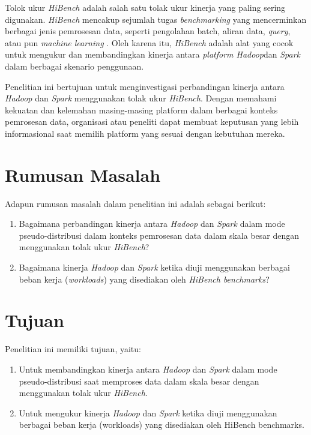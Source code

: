 Tolok ukur \textit{HiBench} adalah salah satu tolak ukur kinerja yang paling sering digunakan. \textit{HiBench} mencakup sejumlah tugas \textit{benchmarking} yang mencerminkan berbagai jenis pemrosesan data, seperti pengolahan batch, aliran data, \textit{query}, atau pun \textit{machine learning} \cite{huangHiBenchBenchmarkSuite}. Oleh karena itu, \textit{HiBench} adalah alat yang cocok untuk mengukur dan membandingkan kinerja antara \textit{platform Hadoop}dan \textit{Spark} dalam berbagai skenario penggunaan.

Penelitian ini bertujuan untuk menginvestigasi perbandingan kinerja antara \textit{Hadoop} dan \textit{Spark} menggunakan tolak ukur \textit{HiBench}. Dengan memahami kekuatan dan kelemahan masing-masing platform dalam berbagai konteks pemrosesan data, organisasi atau peneliti dapat membuat keputusan yang lebih informasional saat memilih platform yang sesuai dengan kebutuhan mereka.

\section{Rumusan Masalah}
Adapun rumusan masalah dalam penelitian ini adalah sebagai berikut:
\begin{enumerate}{\tiny }
	\item 
	Bagaimana perbandingan kinerja antara \textit{Hadoop} dan \textit{Spark} dalam mode pseudo-distribusi dalam konteks pemrosesan data dalam skala besar dengan menggunakan tolak ukur \textit{HiBench}?
	\item
	Bagaimana kinerja \textit{Hadoop} dan \textit{Spark} ketika diuji menggunakan berbagai beban kerja (\textit{workloads}) yang disediakan oleh \textit{HiBench benchmarks}?
\end{enumerate}

\section{Tujuan}
Penelitian ini memiliki tujuan, yaitu:
	\begin{enumerate}
		\item 
		Untuk membandingkan kinerja antara \textit{Hadoop} dan \textit{Spark} dalam mode pseudo-distribusi saat memproses data dalam skala besar dengan menggunakan tolak ukur \textit{HiBench}.
		\item
		Untuk mengukur kinerja \textit{Hadoop} dan \textit{Spark} ketika diuji menggunakan berbagai beban kerja (workloads) yang disediakan oleh HiBench benchmarks.
	\end{enumerate}

